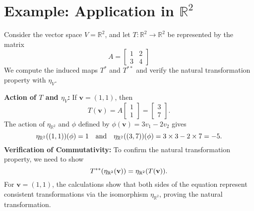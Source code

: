 \section{Example: Application in $\mathbb{R}^2$}
\begin{example}
	Consider the vector space $V = \mathbb{R}^2$, and let $T: \mathbb{R}^2 \rightarrow \mathbb{R}^2$ be represented by the matrix
	\[
	A=\begin{bmatrix}
		1 & 2 \\ 3 & 4
	\end{bmatrix}
	\] We compute the induced maps $T^*$ and $T^{**}$ and verify the natural transformation property with $\eta_V$.
	
	\textbf{Action of $T$ and $\eta_V$:}
	If $\mathbf{v} = (1, 1)$, then \[
	T(\textbf{v})=A\begin{bmatrix}
		1 \\ 1
	\end{bmatrix} = \begin{bmatrix}
	3 \\ 7
\end{bmatrix}.
	\] The action of $\eta_{\mathbb{R}^2}$ and $\phi$ defined by $\phi(\mathbf{v}) = 3v_1 - 2v_2$ gives \[
	\eta_{\mathbb{R}^2}((1,1))(\phi)=1\quad\text{and}\quad\eta_{\mathbb{R}^2}((3,7))(\phi)=3\times 3-2\times 7=-5.
	\] \textbf{Verification of Commutativity:}
	To confirm the natural transformation property, we need to show \[
	T^{**}(\eta_{\mathbb{R}^2}(\textbf{v}))=\eta_{\mathbb{R}^2}(T(\textbf{v})).
	\]
	For $\mathbf{v} = (1, 1)$, the calculations show that both sides of the equation represent consistent transformations via the isomorphism $\eta_{\mathbb{R}^2}$, proving the natural transformation.
\end{example}
\newpage
